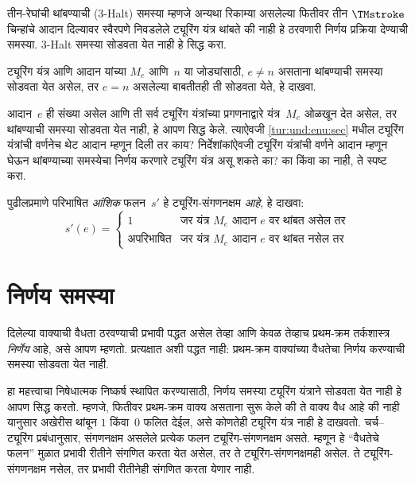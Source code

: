 \begin{prob}
तीन-रेघांची थांबण्याची (3-Halt) समस्या
म्हणजे अन्यथा रिकाम्या असलेल्या फितीवर
तीन $\TMstroke$ चिन्हांचे आदान दिल्यावर
स्वैरपणे निवडलेले ट्यूरिंग यंत्र थांबते
की नाही हे ठरवणारी निर्णय प्रक्रिया
देण्याची समस्या. 3-Halt समस्या
सोडवता येत नाही हे सिद्ध करा.
\end{prob}

\begin{prob}
ट्यूरिंग यंत्र आणि आदान यांच्या
$M_e$ आणि~$n$ या जोड्यांसाठी,
$e \neq n$ असताना थांबण्याची समस्या
सोडवता येत असेल, तर $e = n$
असलेल्या बाबतीतही ती सोडवता
येते, हे दाखवा.
\end{prob}

\begin{prob}
आदान~$e$ ही संख्या असेल आणि ती
सर्व ट्यूरिंग यंत्रांच्या प्रगणनाद्वारे
यंत्र~$M_e$ ओळखून देत असेल,
तर थांबण्याची समस्या सोडवता
येत नाही, हे आपण सिद्ध केले.
त्याऐवजी \ref{tur:und:enu:sec}
मधील ट्यूरिंग यंत्रांची वर्णनेच
थेट आदान म्हणून दिली तर काय?
निर्देशांकांऐवजी ट्यूरिंग यंत्रांची
वर्णने आदान म्हणून घेऊन थांबण्याच्या
समस्येचा निर्णय करणारे ट्यूरिंग
यंत्र असू शकते का? का किंवा
का नाही, ते स्पष्ट करा.
\end{prob}

\begin{prob} पुढीलप्रमाणे परिभाषित
  \emph{आंशिक} फलन~$s'$ हे
  ट्यूरिंग-संगणनक्षम \emph{आहे},
  हे दाखवा:
  \[  s'(e) =
  \begin{cases}
    \text{1} & \text{जर यंत्र~$M_e$ आदान $e$ वर थांबत असेल तर}\\
    \text{अपरिभाषित} & \text{जर यंत्र~$M_e$ आदान $e$ वर थांबत नसेल तर}
  \end{cases}
  \]
\end{prob}











\section{निर्णय समस्या}\label{tur:und:dec:sec}

दिलेल्या वाक्याची वैधता ठरवण्याची
प्रभावी पद्धत असेल तेव्हा आणि केवळ तेव्हाच
प्रथम-क्रम तर्कशास्त्र \emph{निर्णेय} आहे,
असे आपण म्हणतो. प्रत्यक्षात अशी पद्धत नाही:
प्रथम-क्रम वाक्यांच्या वैधतेचा निर्णय
करण्याची समस्या सोडवता येत नाही.

हा महत्त्वाचा निषेधात्मक निष्कर्ष स्थापित
करण्यासाठी, निर्णय समस्या ट्यूरिंग यंत्राने
सोडवता येत नाही हे आपण सिद्ध करतो.
म्हणजे, फितीवर प्रथम-क्रम वाक्य असताना सुरू केले की ते वाक्य वैध
आहे की नाही यानुसार अखेरीस थांबून
$1$ किंवा~$0$ फलित देईल, असे कोणतेही
ट्यूरिंग यंत्र नाही हे दाखवतो.
चर्च--ट्यूरिंग प्रबंधानुसार, संगणनक्षम
असलेले प्रत्येक फलन ट्यूरिंग-संगणनक्षम
असते. म्हणून हे “वैधतेचे फलन”
मुळात प्रभावी रीतीने संगणित करता
येत असेल, तर ते ट्यूरिंग-संगणनक्षमही
असेल. ते ट्यूरिंग-संगणनक्षम नसेल,
तर प्रभावी रीतीनेही संगणित करता
येणार नाही.

